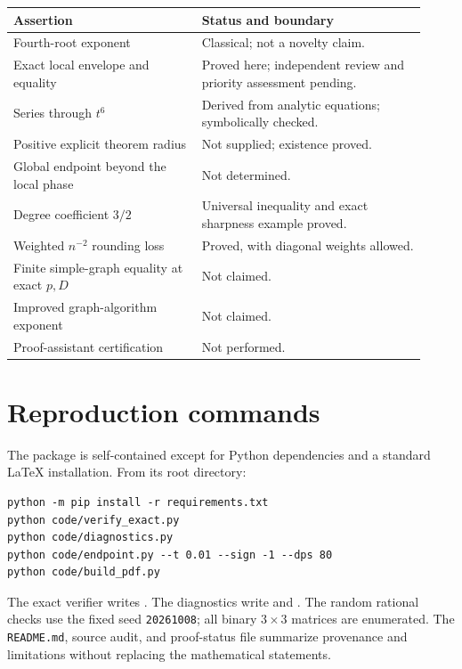 \documentclass[11pt]{article}
\theoremstyle{definition}
\newcommand{\1}{\mathbf 1}
\begin{document}
\begin{center}
\begin{tabular}{@{}p{0.42\linewidth}p{0.50\linewidth}@{}}
\toprule
Assertion & Status and boundary\\
\midrule
Fourth-root exponent & Classical; not a novelty claim.\\[3pt]
Exact local envelope and equality & Proved here; independent review and priority assessment pending.\\[3pt]
Series through $t^6$ & Derived from analytic equations; symbolically checked.\\[3pt]
Positive explicit theorem radius & Not supplied; existence proved.\\[3pt]
Global endpoint beyond the local phase & Not determined.\\[3pt]
Degree coefficient $3/2$ & Universal inequality and exact sharpness example proved.\\[3pt]
Weighted $n^{-2}$ rounding loss & Proved, with diagonal weights allowed.\\[3pt]
Finite simple-graph equality at exact $p,D$ & Not claimed.\\[3pt]
Improved graph-algorithm exponent & Not claimed.\\[3pt]
Proof-assistant certification & Not performed.\\
\bottomrule
\end{tabular}
\end{center}

\clearpage
\section{Reproduction commands}
The package is self-contained except for Python dependencies and a standard LaTeX installation. From its root directory:
\begin{verbatim}
python -m pip install -r requirements.txt
python code/verify_exact.py
python code/diagnostics.py
python code/endpoint.py --t 0.01 --sign -1 --dps 80
python code/build_pdf.py
\end{verbatim}
The exact verifier writes . The diagnostics write  and . The random rational checks use the fixed seed \texttt{20261008}; all binary $3\times3$ matrices are enumerated. The \texttt{README.md}, source audit, and proof-status file summarize provenance and limitations without replacing the mathematical statements.

\begingroup
\raggedright


\endgroup
\end{document}
